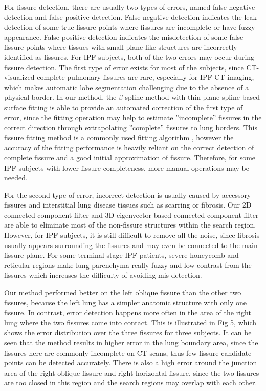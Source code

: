 {For fissure detection, there are usually two types of errors, named false negative detection and false positive detection. False negative detection indicates the leak detection of some true fissure points where fissures are incomplete or have fuzzy appearance. False positive detection indicates the misdetection of some false fissure points where tissues with small plane like structures are incorrectly identified as fissures. For IPF subjects, both of the two errors may occur during fissure detection. The first type of error exists for most of the subjects, since CT-visualized complete pulmonary fissures are rare, especially for IPF CT imaging, which makes automatic lobe segmentation challenging due to the absence of a physical border. In our method, the $\beta$-spline method with thin plane spline based surface fitting is able to provide an automated correction of the first type of error, since the fitting operation may help to estimate ''incomplete'' fissures in the correct direction through extrapolating ''complete'' fissures to lung borders. This fissure fitting method  is a commonly used fitting algorithm \citep{lee1997scattered,doel2012pulmonary}, however the accuracy of the fitting performance is heavily reliant on the correct detection of complete fissure and a good initial approximation of fissure. Therefore, for some IPF subjects with lower fissure completeness, more manual operations may be needed.

For the second type of error, incorrect detection is usually caused by accessory fissures and interstitial lung disease tissues such as scarring or fibrosis. Our 2D connected component filter and 3D eigenvector based connected component filter are able to eliminate most of the non-fissure structures within the search region. However, for IPF subjects, it is still difficult to remove all the noise, since fibrosis usually appears surrounding the fissures and may even be connected to the main fissure plane. For some terminal stage IPF patients, severe honeycomb and reticular regions make lung parenchyma really fuzzy and low contrast from the fissures which increases the difficulty of avoiding mis-detection.

Our method performed better on the left oblique fissure than the other two fissures, because the left lung has a simpler anatomic structure with only one fissure. In contrast, error detection happens more often in the area of the right lung where the two fissures come into contact. This is illustrated in Fig 5, which shows the error distribution over the three fissures for three subjects. It can be seen that the method results in higher error in the lung boundary area, since the fissures here are commonly incomplete on CT scans, thus few fissure candidate points can be detected accurately. There is also a high error around the junction area of the right oblique fissure and right horizontal fissure, since the two fissures are too closed in this region and the search regions may overlap with each other.

}
